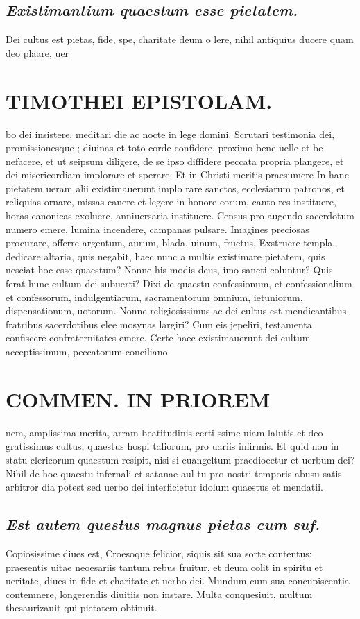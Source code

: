 \documentclass{article}
\begin{document}
\begin{pages}
\subsection*{\textit{Existimantium quaestum esse pietatem. }}\pstart Dei cultus est pietas, fide, spe, charitate deum o lere, nihil antiquius ducere quam deo plaare, uer\pend
\section*{TIMOTHEI EPISTOLAM. }
\marginpar{[ p.161 ]}\pstart bo dei insistere, meditari die ac nocte in lege domini. Scrutari testimonia dei, promissionesque ; diuinas et toto corde confidere, proximo bene uelle et be nefacere, et ut seipsum diligere, de se ipso diffidere peccata propria plangere, et dei misericordiam implorare et sperare. Et in Christi meritis praesumere In hanc pietatem ueram alii existimauerunt implo rare sanctos, ecclesiarum patronos, et reliquias ornare, missas canere et legere in honore eorum, canto res instituere, horas canonicas exoluere, anniuersaria instituere. Census pro augendo sacerdotum numero emere, lumina incendere, campanas pulsare. Imagines preciosas procurare, offerre argentum, aurum, blada, uinum, fructus. Exstruere templa, dedicare altaria, quis negabit, haec nunc a multis existimare pietatem, quis nesciat hoc esse quaestum? Nonne his modis deus, imo sancti coluntur? Quis ferat hunc cultum dei subuerti? Dixi de quaestu confessionum, et confessionalium et confessorum, indulgentiarum, sacramentorum omnium, ietuniorum, dispensationum, uotorum. Nonne religiosissimus ac dei cultus est mendicantibus fratribus sacerdotibus elee mosynas largiri? Cum eis jepeliri, testamenta confiscere confraternitates emere. Certe haec existimauerunt dei cultum acceptissimum, peccatorum conciliano\pend
\section*{COMMEN. IN PRIOREM }
\marginpar{[ p.162 ]}\pstart nem, amplissima merita, arram beatitudinis certi ssime uiam lalutis et deo gratissimus cultus, quaestus hospi taliorum, pro uariis infirmis. Et quid non in statu clericorum quaestum resipit, nisi si euangeltum praedioeetur et uerbum dei? Nihil de hoc quaestu infernali et satanae aul tu pro nostri temporis abusu satis arbitror dia potest sed uerbo dei interficietur idolum quaestus et mendatii.  \pend
{}
{}
\subsection*{\textit{Est autem questus magnus pietas cum suf. }}\pstart Copiosissime diues est, Croesoque felicior, siquis sit sua sorte contentus: praesentis uitae neoesariis tantum rebus fruitur, et deum colit in spiritu et ueritate, diues in fide et charitate et uerbo dei. Mundum cum sua concupiscentia contemnere, longerendis diuitiis non instare. Multa conquesiuit, multum thesaurizauit qui pietatem obtinuit.  \pend
{}
{}

\end{pages}
\end{document}
